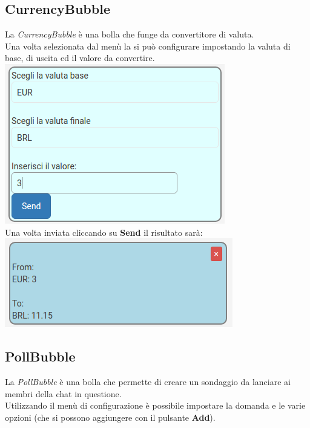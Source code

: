 \subsection{CurrencyBubble}
La \textit{CurrencyBubble} è una bolla che funge da convertitore di valuta.
\\Una volta selezionata dal menù la si può configurare impostando la valuta di base, di uscita ed il valore da convertire.\\

\includegraphics[scale=0.75]{img/currConfig.png}
\\
Una volta inviata cliccando su \textbf{Send} il risultato sarà:\\

\includegraphics[scale=0.75]{img/curr.png}
\newpage
\subsection{PollBubble}
La \textit{PollBubble} è una bolla che permette di creare un sondaggio da lanciare ai membri della chat in questione.\\
Utilizzando il menù di configurazione è possibile impostare la domanda e le varie opzioni (che si possono aggiungere con il pulsante \textbf{Add}).
\\

